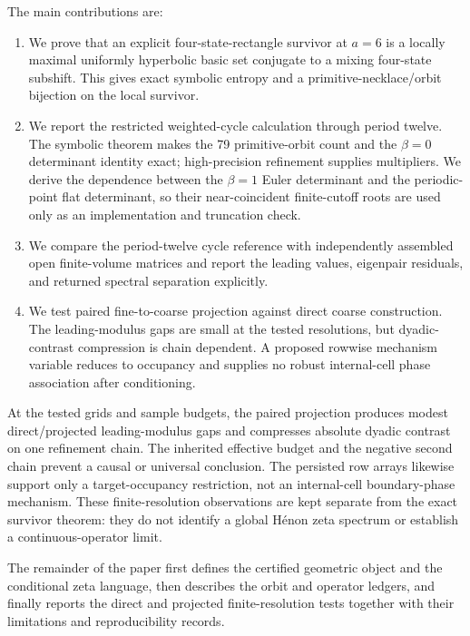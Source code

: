 The main contributions are:
\begin{enumerate}[leftmargin=1.6em]
  \item We prove that an explicit four-state-rectangle survivor at $a=6$ is a
  locally maximal uniformly hyperbolic basic set conjugate to a mixing
  four-state subshift.  This gives exact symbolic entropy and a
  primitive-necklace/orbit bijection on the local survivor.
  \item We report the restricted weighted-cycle calculation through period
  twelve.
  The symbolic theorem makes the 79 primitive-orbit count and the $\beta=0$
  determinant identity exact; high-precision refinement supplies multipliers.
  We derive the dependence between the $\beta=1$ Euler determinant and the
  periodic-point flat determinant, so their near-coincident finite-cutoff roots
  are used only as an implementation and truncation check.
  \item We compare the period-twelve cycle reference with independently
  assembled open finite-volume matrices and report the leading values,
  eigenpair residuals, and returned spectral separation explicitly.
  \item We test paired fine-to-coarse projection against direct coarse
  construction.  The leading-modulus gaps are small at the tested resolutions,
  but dyadic-contrast compression is chain dependent.  A proposed rowwise
  mechanism variable reduces to occupancy and supplies no robust internal-cell
  phase association after conditioning.
\end{enumerate}

At the tested grids and sample budgets, the paired projection produces modest
direct/projected leading-modulus gaps and compresses absolute dyadic contrast
on one refinement chain.  The inherited effective budget and the negative
second chain prevent a causal or universal conclusion.  The persisted row
arrays likewise support only a target-occupancy restriction, not an
internal-cell boundary-phase mechanism.  These finite-resolution observations
are kept separate from the exact survivor theorem: they do not identify a
global H\'enon zeta spectrum or establish a continuous-operator limit.

The remainder of the paper first defines the certified geometric object and
the conditional zeta language, then describes the orbit and operator ledgers,
and finally reports the direct and projected finite-resolution tests together
with their limitations and reproducibility records.
